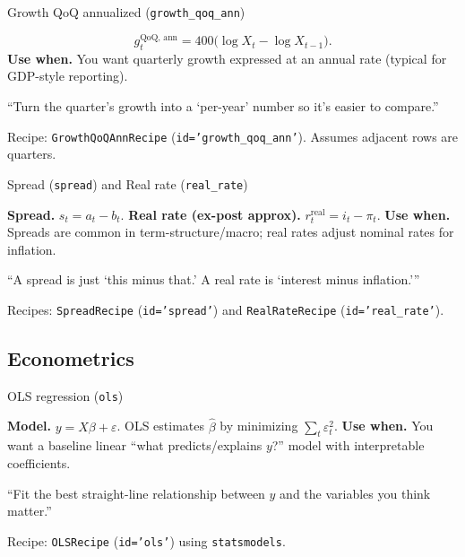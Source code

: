 \documentclass[11pt]{article}
\begin{document}
\begin{ConceptBox}{Growth QoQ annualized (\texttt{growth\_qoq\_ann})}
\begin{ClassroomBox}
\[
g^{\text{QoQ, ann}}_t = 400\big(\log X_t-\log X_{t-1}\big).
\]
\textbf{Use when.} You want quarterly growth expressed at an annual rate (typical for GDP-style reporting).
\end{ClassroomBox}
\begin{IntuitionBox}
“Turn the quarter’s growth into a ‘per-year’ number so it’s easier to compare.”
\end{IntuitionBox}
\begin{WhereBox}
Recipe: \texttt{GrowthQoQAnnRecipe} (\texttt{id='growth\_qoq\_ann'}). Assumes adjacent rows are quarters.
\end{WhereBox}
\end{ConceptBox}

\begin{ConceptBox}{Spread (\texttt{spread}) and Real rate (\texttt{real\_rate})}
\begin{ClassroomBox}
\textbf{Spread.} \(s_t = a_t - b_t\). \quad \textbf{Real rate (ex-post approx).} \(r^{\text{real}}_t = i_t - \pi_t\).
\textbf{Use when.} Spreads are common in term-structure/macro; real rates adjust nominal rates for inflation.
\end{ClassroomBox}
\begin{IntuitionBox}
“A spread is just ‘this minus that.’ A real rate is ‘interest minus inflation.’”
\end{IntuitionBox}
\begin{WhereBox}
Recipes: \texttt{SpreadRecipe} (\texttt{id='spread'}) and \texttt{RealRateRecipe} (\texttt{id='real\_rate'}).
\end{WhereBox}
\end{ConceptBox}

\subsection{Econometrics}

\begin{ConceptBox}{OLS regression (\texttt{ols})}
\begin{ClassroomBox}
\textbf{Model.} \(y = X\beta + \varepsilon\). OLS estimates \(\hat{\beta}\) by minimizing \(\sum_t \varepsilon_t^2\).
\textbf{Use when.} You want a baseline linear “what predicts/explains \(y\)?” model with interpretable coefficients.
\end{ClassroomBox}
\begin{IntuitionBox}
“Fit the best straight-line relationship between \(y\) and the variables you think matter.”
\end{IntuitionBox}
\begin{WhereBox}
Recipe: \texttt{OLSRecipe} (\texttt{id='ols'}) using \texttt{statsmodels}.
\end{WhereBox}
\end{ConceptBox}
\end{document}
